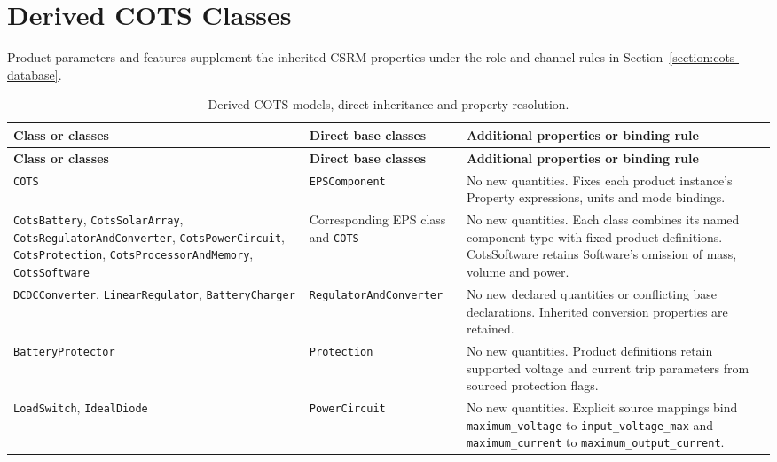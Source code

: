 \section{Derived COTS Classes}
Product parameters and features supplement the inherited CSRM properties under the role and channel rules in Section~\ref{section:cots-database}.

\begingroup
\fontsize{9}{10.5}\selectfont
\setlength{\tabcolsep}{4pt}
\setlength{\parskip}{0pt}
\renewcommand{\arraystretch}{1.0}
\setlength{\ReportTableBodyWidth}{\dimexpr\linewidth-4\tabcolsep\relax}
\begin{longtable}{@{}P{0.30\ReportTableBodyWidth}P{0.27\ReportTableBodyWidth}P{0.43\ReportTableBodyWidth}@{}}
\caption{Derived COTS models, direct inheritance and property resolution.}\label{tab:derived-cots-models}\\
\toprule
\textbf{Class or classes} & \textbf{Direct base classes} & \textbf{Additional properties or binding rule} \\
\midrule
\endfirsthead
\toprule
\textbf{Class or classes} & \textbf{Direct base classes} & \textbf{Additional properties or binding rule} \\
\midrule
\endhead
\bottomrule
\endfoot
\texttt{COTS} & \texttt{EPSComponent} & No new quantities. Fixes each product instance's Property expressions, units and mode bindings. \\
\texttt{CotsBattery}, \texttt{CotsSolarArray}, \texttt{CotsRegulatorAndConverter}, \texttt{CotsPowerCircuit}, \texttt{CotsProtection}, \texttt{CotsProcessorAndMemory}, \texttt{CotsSoftware} & Corresponding EPS class and \texttt{COTS} & No new quantities. Each class combines its named component type with fixed product definitions. CotsSoftware retains Software's omission of mass, volume and power. \\
\texttt{DCDCConverter}, \texttt{LinearRegulator}, \texttt{BatteryCharger} & \texttt{RegulatorAndConverter} & No new declared quantities or conflicting base declarations. Inherited conversion properties are retained. \\
\texttt{BatteryProtector} & \texttt{Protection} & No new quantities. Product definitions retain supported voltage and current trip parameters from sourced protection flags. \\
\texttt{LoadSwitch}, \texttt{IdealDiode} & \texttt{PowerCircuit} & No new quantities. Explicit source mappings bind \texttt{maximum\_voltage} to \texttt{input\_voltage\_max} and \texttt{maximum\_current} to \texttt{maximum\_output\_current}. \\

\end{longtable}
